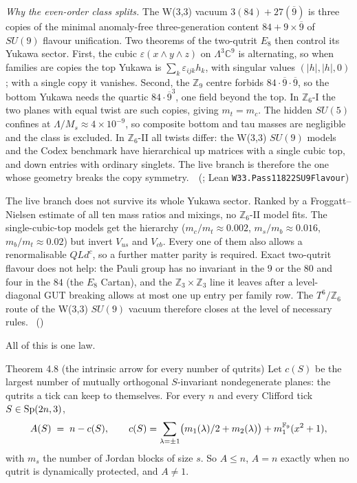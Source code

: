 \emph{Why the even-order class splits.} The W(3,3) vacuum $3(84)+27(\overline9)$ is three copies of the minimal anomaly-free
three-generation content $84+9\times\overline9$ of $SU(9)$ flavour unification. Two theorems of the two-qutrit $E_8$ then
control its Yukawa sector. First, the cubic $\varepsilon(x\wedge y\wedge z)$ on $\Lambda^3\mathbb C^9$ is alternating, so when
families are copies the top Yukawa is $\sum_k\varepsilon_{ijk}h_k$, with singular values $(|h|,|h|,0)$; with a single copy it
vanishes. Second, the $\mathbb Z_9$ centre forbids $84\cdot\overline9\cdot\overline9$, so the bottom Yukawa needs the quartic
$84\cdot\overline9^3$, one field beyond the top. In $\mathbb Z_6$-I the two planes with equal twist are such copies, giving
$m_t=m_c$. The hidden $SU(5)$ confines at $\Lambda/M_s\approx4\times10^{-9}$, so composite bottom and tau masses are negligible
and the class is excluded. In $\mathbb Z_6$-II all twists differ: the W(3,3) $SU(9)$ models and the Codex benchmark have
hierarchical up matrices with a single cubic top, and down entries with ordinary singlets. The live branch is therefore the
one whose geometry breaks the copy symmetry.
\tierT\,\tierC\ (; Lean \texttt{W33.Pass11822SU9Flavour})

The live branch does not survive its whole Yukawa sector. Ranked by a Froggatt--Nielsen estimate of all ten mass ratios
and mixings, no $\mathbb Z_6$-II model fits. The single-cubic-top models get the hierarchy ($m_c/m_t\approx0.002$,
$m_s/m_b\approx0.016$, $m_b/m_t\approx0.02$) but invert $V_{us}$ and $V_{cb}$. Every one of them also allows a
renormalisable $QLd^c$, so a further matter parity is required. Exact two-qutrit flavour does not help: the Pauli group has
no invariant in the $9$ or the $80$ and four in the $84$ (the $E_8$ Cartan), and the $\mathbb Z_3\times\mathbb Z_3$ line it
leaves after a level-diagonal GUT breaking allows at most one up entry per family row. The $T^6/\mathbb Z_6$ route of the
W(3,3) $SU(9)$ vacuum therefore closes at the level of necessary rules.
\tierC\ ()

All of this is one law.

\begin{result}{Theorem 4.8 (the intrinsic arrow for every number of qutrits) \hfill \tierT}
Let $c(S)$ be the largest number of mutually orthogonal $S$-invariant nondegenerate planes: the qutrits a tick can
keep to themselves. For every $n$ and every Clifford tick $S\in\mathrm{Sp}(2n,3)$,
\[
A(S)\;=\;n-c(S),
\qquad
c(S)=\sum_{\lambda=\pm1}\bigl(m_1(\lambda)/2+m_2(\lambda)\bigr)+m_1^{\mathbb{F}_9}(x^2+1),
\]
with $m_s$ the number of Jordan blocks of size $s$. So $A\le n$, $A=n$ exactly when no qutrit is dynamically protected,
and $A\ne1$.
\end{result}

